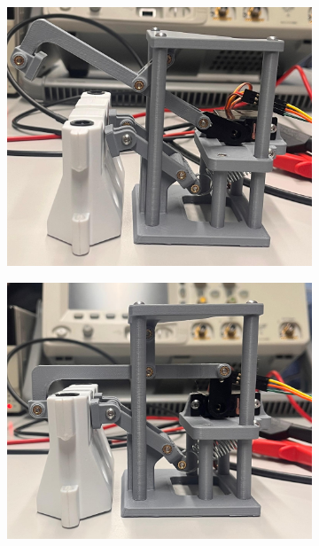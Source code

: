 \begin{figure}[H]
\centering
\begin{subfigure}{0.32\textwidth}
\centering
\includegraphics[width=0.95\linewidth]{assets/greifer-prototyp/Bild_Greifer_2_offen.jpeg} 
\end{subfigure}
\begin{subfigure}{0.32\textwidth}
\centering
\includegraphics[width=0.95\linewidth]{assets/greifer-prototyp/Bild_Greifer_2_klemmen.jpeg} 
\end{subfigure}
\begin{subfigure}{0.32\textwidth}
\centering

\end{subfigure}
\end{figure}

